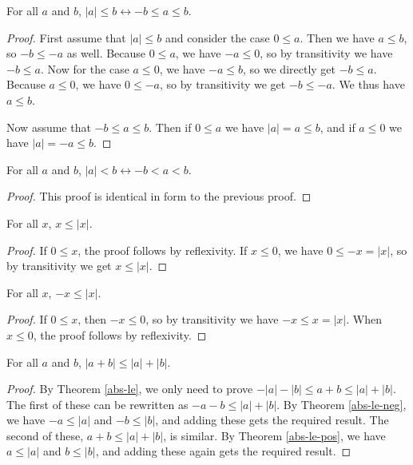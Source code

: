 \documentclass[../math.tex]{subfiles}
\begin{document}
\begin{theorem} \label{abs-le}
    For all $a$ and $b$, $|a| \leq b \leftrightarrow -b \leq a \leq b$.
\end{theorem}
\begin{proof}
    First assume that $|a| \leq b$ and consider the case $0 \leq a$.  Then we
    have $a \leq b$, so $-b \leq -a$ as well.  Because $0 \leq a$, we have $-a
    \leq 0$, so by transitivity we have $-b \leq a$.  Now for the case $a \leq
    0$, we have $-a \leq b$, so we directly get $-b \leq a$.  Because $a \leq
    0$, we have $0 \leq -a$, so by transitivity we get $-b \leq -a$.  We thus
    have $a \leq b$.

    Now assume that $-b \leq a \leq b$.  Then if $0 \leq a$ we have $|a| = a
    \leq b$, and if $a \leq 0$ we have $|a| = -a \leq b$.
\end{proof}

\begin{theorem} \label{abs-lt}
    For all $a$ and $b$, $|a| < b \leftrightarrow -b < a < b$.
\end{theorem}
\begin{proof}
    This proof is identical in form to the previous proof.
\end{proof}

\begin{theorem} \label{abs-le-pos}
    For all $x$, $x \leq |x|$.
\end{theorem}
\begin{proof}
    If $0 \leq x$, the proof follows by reflexivity.  If $x \leq 0$, we have $0
    \leq -x = |x|$, so by transitivity we get $x \leq |x|$.
\end{proof}

\begin{theorem} \label{abs-le-neg}
    For all $x$, $-x \leq |x|$.
\end{theorem}
\begin{proof}
    If $0 \leq x$, then $-x \leq 0$, so by transitivity we have $-x \leq x =
    |x|$.  When $x \leq 0$, the proof follows by reflexivity.
\end{proof}

\begin{theorem}
    For all $a$ and $b$, $|a + b| \leq |a| + |b|$.
\end{theorem}
\begin{proof}
    By Theorem \ref{abs-le}, we only need to prove $-|a| - |b| \leq a + b \leq
    |a| + |b|$.  The first of these can be rewritten as $-a - b \leq |a| + |b|$.
    By Theorem \ref{abs-le-neg}, we have $-a \leq |a|$ and $-b \leq |b|$, and
    adding these gets the required result.  The second of these, $a + b \leq |a|
    + |b|$, is similar.  By Theorem \ref{abs-le-pos}, we have $a \leq |a|$ and
    $b \leq |b|$, and adding these again gets the required result.
\end{proof}
\end{document}
